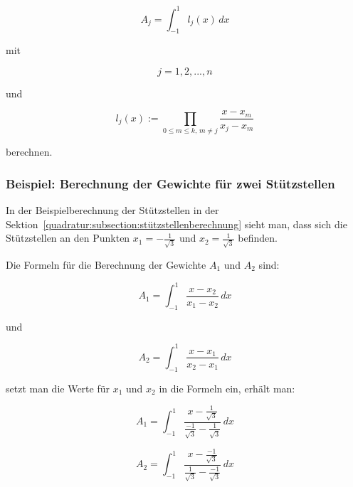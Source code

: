 \begin{equation*}
    A_{j} = \int_{-1}^{1} l_j(x) \, dx
\end{equation*}

\noindent
mit

\begin{equation*}
    j = 1, 2, ... , n
\end{equation*}

\noindent
und 

\begin{equation}
    l_{j}(x) := \prod_{0 \leq m \leq k, \, m \neq j} \frac{x - x_{m}}{x_{j} - x_{m}}
\end{equation}

\noindent
berechnen.

\newpage

\subsubsection{Beispiel: Berechnung der Gewichte für zwei Stützstellen}
In der Beispielberechnung der Stützstellen in der 
Sektion~\ref{quadratur:subsection:stützstellenberechnung} sieht man, dass sich die 
Stützstellen an den Punkten $x_{1} = -\frac{1}{\sqrt{3}} $ und $x_{2} = \frac{1}{\sqrt{3}} $ befinden.

\noindent
Die Formeln für die Berechnung der Gewichte $A_{1}$ und $A_{2}$ sind:

\begin{equation*}
    A_{1} = \int_{-1}^{1} \frac{x - x_{2}}{x_{1} - x_{2}} \, dx
\end{equation*}

\noindent
und

\begin{equation}
    A_{2} = \int_{-1}^{1} \frac{x - x_{1}}{x_{2} - x_{1}} \, dx
\end{equation}


\noindent
setzt man die Werte für $x_{1}$ und $x_{2}$ in die Formeln ein, erhält man:

\begin{equation*}
    A_{1} = \int_{-1}^{1} \frac{x - \frac{1}{\sqrt{3}}}{\frac{-1}{\sqrt{3}} - \frac{1}{\sqrt{3}}} \, dx
\end{equation*}

\begin{equation}
    A_{2} = \int_{-1}^{1} \frac{x - \frac{-1}{\sqrt{3}}}{\frac{1}{\sqrt{3}} - \frac{-1}{\sqrt{3}}} \, dx
\end{equation}

